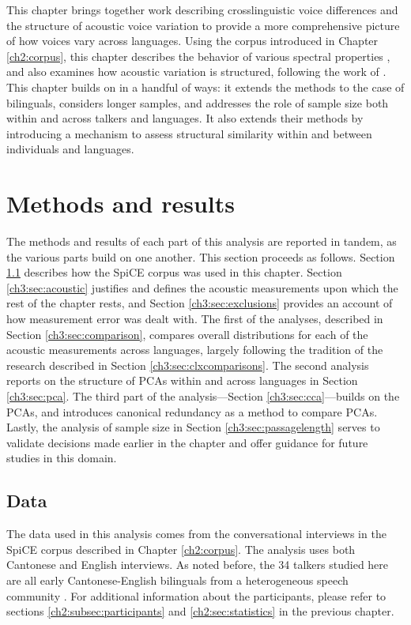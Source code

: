 This chapter brings together work describing crosslinguistic voice differences and the structure of acoustic voice variation to provide a more comprehensive picture of how voices vary across languages. Using the corpus introduced in Chapter \ref{ch2:corpus}, this chapter describes the behavior of various spectral properties \citep[e.g.][]{ng_2012_ltas}, and also examines how acoustic variation is structured, following the work of \citet{lee_2019_acoustic}. This chapter builds on \citet{lee_2019_acoustic} in a handful of ways: it extends the methods to the case of bilinguals, considers longer samples, and addresses the role of sample size both within and across talkers and languages. It also extends their methods by introducing a mechanism to assess structural similarity within and between individuals and languages. 

\section{Methods and results}\label{ch3:sec:methods_results}

The methods and results of each part of this analysis are reported in tandem, as the various parts build on one another. This section proceeds as follows. Section \ref{ch3:sec:data} describes how the SpiCE corpus was used in this chapter. Section \ref{ch3:sec:acoustic} justifies and defines the acoustic measurements upon which the rest of the chapter rests, and Section \ref{ch3:sec:exclusions} provides an account of how measurement error was dealt with. The first of the analyses, described in Section \ref{ch3:sec:comparison}, compares overall distributions for each of the acoustic measurements across languages, largely following the tradition of the research described in Section \ref{ch3:sec:clxcomparisons}. The second analysis reports on the structure of PCAs within and across languages in Section \ref{ch3:sec:pca}. The third part of the analysis---Section \ref{ch3:sec:cca}---builds on the PCAs, and introduces canonical redundancy as a method to compare PCAs. Lastly, the analysis of sample size in Section \ref{ch3:sec:passagelength} serves to validate decisions made earlier in the chapter and offer guidance for future studies in this domain.

\subsection{Data}\label{ch3:sec:data}

The data used in this analysis comes from the conversational interviews in the SpiCE corpus described in Chapter \ref{ch2:corpus}. The analysis uses both Cantonese and English interviews. As noted before, the 34 talkers studied here are all early Cantonese-English bilinguals from a heterogeneous speech community \citep{liang_2015_china}. For additional information about the participants, please refer to sections \ref{ch2:subsec:participants} and \ref{ch2:sec:statistics} in the previous chapter. 

